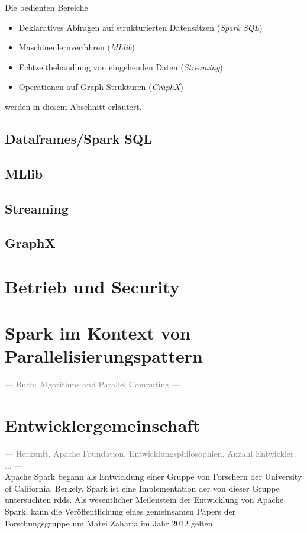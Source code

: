 Die bedienten Bereiche
\begin{itemize}
	\item Deklaratives Abfragen auf strukturierten Datensätzen (\textit{Spark SQL})
	\item Maschinenlernverfahren (\textit{MLlib})
	\item Echtzeitbehandlung von eingehenden Daten (\textit{Streaming})
	\item Operationen auf Graph-Strukturen (\textit{GraphX})
\end{itemize}
werden in diesem Abschnitt erläutert.

\subsection{Dataframes/Spark SQL}


\subsection{MLlib}
\subsection{Streaming}
\subsection{GraphX}

\section{Betrieb und Security}

\section{Spark im Kontext von Parallelisierungspattern}
\textcolor{gray}{--- Buch: Algorithms and Parallel Computing ---}\\

\section{Entwicklergemeinschaft}
\textcolor{gray}{--- Herkunft, Apache Foundation, Entwicklungsphilosophien, Anzahl Entwickler, ... ---}\\

Apache Spark begann als Entwicklung einer Gruppe von Forschern der University of California, Berkely. Spark ist eine Implementation der von dieser Gruppe untersuchten \glspl{rdd}\cite{Mat12}. Als wesentlicher Meilenstein der Entwicklung von Apache Spark, kann die Veröffentlichung eines gemeinsamen Papers der Forschungsgruppe um Matei Zaharia im Jahr 2012 gelten.\\

